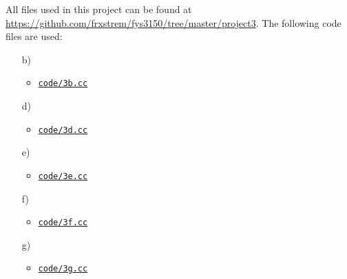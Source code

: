 \documentclass[11pt,a4paper]{article}
\begin{document}
All files used in this project can be found at \url{https://github.com/frxstrem/fys3150/tree/master/project3}.
The following code files are used:
\begin{enumerate}
  \item[b)]
    \begin{itemize}
      \item \href{https://github.com/frxstrem/fys3150/tree/master/project3/code/3b.cc}{\tt code/3b.cc}
    \end{itemize}

  \item[d)]
    \begin{itemize}
      \item \href{https://github.com/frxstrem/fys3150/tree/master/project3/code/3b.cc}{\tt code/3d.cc}
    \end{itemize}

  \item[e)]
    \begin{itemize}
      \item \href{https://github.com/frxstrem/fys3150/tree/master/project3/code/3b.cc}{\tt code/3e.cc}
    \end{itemize}

  \item[f)]
    \begin{itemize}
      \item \href{https://github.com/frxstrem/fys3150/tree/master/project3/code/3b.cc}{\tt code/3f.cc}
    \end{itemize}

  \item[g)]
    \begin{itemize}
      \item \href{https://github.com/frxstrem/fys3150/tree/master/project3/code/3b.cc}{\tt code/3g.cc}
    \end{itemize}
\end{enumerate}
\end{document}
